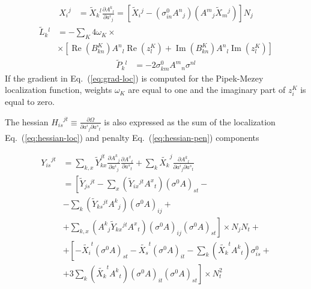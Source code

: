 \documentclass[aps,prl,reprint,amsmath,amssymb]{revtex4-1}
\begin{document}
%
\begin{equation} \label{eq:grad-convert}
\begin{split}
{X_i}^j & = \tilde{X}{_k}^l \frac{\partial {A^k}_l}{\partial {a^i}_j} = \left[ \tilde{X}{_i}^j - ( \sigma_{in}^0 {A^n}_j ) ( {A^m}_j \tilde{X}{_m}^j ) \right] N_j 
\end{split}
\end{equation}
%
\begin{equation} \label{eq:grad-loc}
\begin{split}
\tilde{L}{_k}^l & = - \sum_K {4 \omega_K} \times \\ 
&\times \left[  \operatorname{Re}(B^{K}_{kn}) {A^{n}}_{l} \operatorname{Re}(z_{l}^{K}) + \operatorname{Im}(B^{K}_{kn}) {A^{n}}_{l} \operatorname{Im}(z_{l}^{K}) \right]
\end{split}
\end{equation}
%
\begin{equation} \label{eq:grad-pen}
\begin{split}
\tilde{P}{_k}^l & = -2 \sigma_{km}^0 {A^m}_n \sigma^{nl}
\end{split}
\end{equation}
%
If the gradient in Eq.~(\ref{eq:grad-loc}) is computed for the Pipek-Mezey localization function, weights $\omega_K$ are equal to one and the imaginary part of $z_{i}^{K}$ is equal to zero.



The hessian ${H_{is}}^{jt} \equiv \frac{\partial \Omega}{\partial {a^i}_j \partial{a^s}_t}$ is also expressed as the sum of the localization Eq.~(\ref{eq:hessian-loc}) and penalty Eq.~(\ref{eq:hessian-pen}) components


%
\begin{equation} \label{eq:hessian-convert}
\begin{split}
{Y_{is}}^{jt} &= \sum_{k,x} \tilde{Y}_{kx}^{jt} \frac{\partial {A^k}_j}{\partial {a^i}_j} \frac{\partial {A^x}_t}{\partial {a^s}_t} + \sum_{k} \tilde{X_k}^j \frac{\partial {A^k}_l}{\partial {a^i}_j \partial{a^s}_t}  \\
&= \left[ \tilde{Y}{_{js}}^{jt} - \sum_{x}\left(\tilde{Y}{_{ix}}^{jt} {A^x}_t \right)\left(\sigma^0 A\right)_{st} - \right.\\
&\left. - \sum_{k}\left(\tilde{Y}{_{ks}}^{jt} {A^k}_j\right)\left(\sigma^0 A\right)_{ij} + \right.\\
&\left. + \sum_{k,x}\left({A^k}_j \tilde{Y}{_{kx}}^{jt} {A^x}_t\right)\left(\sigma^0 A\right)_{ij}\left(\sigma^0 A\right)_{st} \right] \times N_j N_t + \\
&+ \left[ -\tilde{X_i}^t \left(\sigma^0 A \right)_{st} - \tilde{X_s}^t \left(\sigma^0 A \right)_{it} - \sum_{k} \left( \tilde{X_k}^t {A^k}_t \right)\sigma^0_{is}  + \right.\\
&\left. + 3 \sum_{k} \left(\tilde{X_k}^t {A^k}_t \right) \left(\sigma^0 A\right)_{it} \left(\sigma^0 A\right)_{st} \right] \times N_{t}^2
\end{split}
\end{equation}
%
\end{document}

